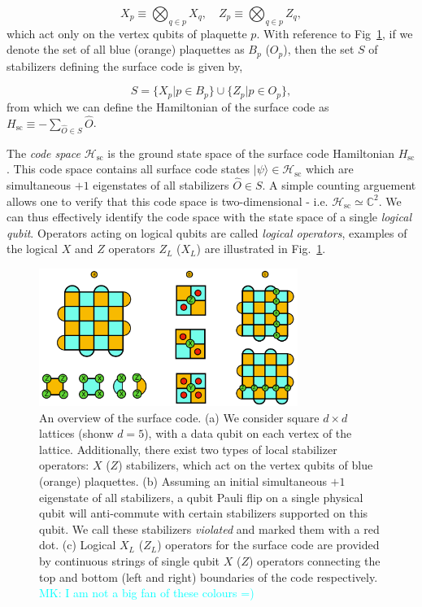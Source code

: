 \documentclass[onecolumn,preprintnumbers,amsmath,amssymb,notitlepage,nofootinbib,longbibliography,superscriptaddress,aps,pra,10pt]{revtex4-1}
\newcommand{\mk}[1]{\textcolor{Cyan}{MK: #1}}
\begin{document}
	\begin{equation}
		X_{p} \equiv \bigotimes_{q \in p} X_q, \quad Z_{p} \equiv \bigotimes_{q \in p} Z_q,
	\end{equation}
	which act only on the vertex qubits of plaquette $p$.
	With reference to Fig~\ref{f:surface_code}, if we denote the set of all blue (orange) plaquettes as $B_p$ ($O_p$), then the set $S$ of stabilizers defining the surface code is given by,

	\begin{equation}
		S = \big\{ X_p \vert p \in B_p  \big\} \cup \big\{ Z_p \vert p \in O_p  \big\},
	\end{equation}
	from which we can define the Hamiltonian of the surface code as $H_{\mathrm{sc}} \equiv -\sum_{\hat{O} \in S}\hat{O}$.

	The \textit{code space} $\mathcal{H}_{\mathrm{sc}}$ is the ground state space of the surface code Hamiltonian $H_{\mathrm{sc}}$.
	This code space contains all surface code states $|\psi\rangle \in \mathcal{H}_{\mathrm{sc}}$ which are simultaneous $+1$ eigenstates of all stabilizers $\hat{O} \in S$.
	A simple counting arguement allows one to verify that this code space is two-dimensional - i.e. $\mathcal{H}_{\mathrm{sc}} \simeq \mathbb{C}^2$.
	We can thus effectively identify the code space with the state space of a single \textit{logical qubit}.
	Operators acting on logical qubits are called \textit{logical operators}, examples of the logical $X$ and $Z$ operators $Z_L$ ($X_L$) are illustrated in Fig.~\ref{f:surface_code}.

	\begin{figure}
		\centering
		\includegraphics[width=0.75\textwidth]{surface_code.pdf}
		\caption{
			An overview of the surface code.
			(a) We consider square $d \times d$ lattices (shonw $d=5$), with a data qubit on each vertex of the lattice.
			Additionally, there exist two types of local stabilizer operators: $X$ ($Z$) stabilizers, which act on the vertex qubits of blue (orange) plaquettes.
			(b) Assuming an initial simultaneous $+1$ eigenstate of all stabilizers, a qubit Pauli flip on a single physical qubit will anti-commute with certain stabilizers supported on this qubit.
			We call these stabilizers \textit{violated} and marked them with a red dot.
			(c) Logical $X_L$ ($Z_L$) operators for the surface code are provided by continuous strings of single qubit $X$ ($Z$) operators connecting the top and bottom (left and right) boundaries of the code respectively.
			\mk{I am not a big fan of these colours =) }}
			\label{f:surface_code}
	\end{figure}
\end{document}
